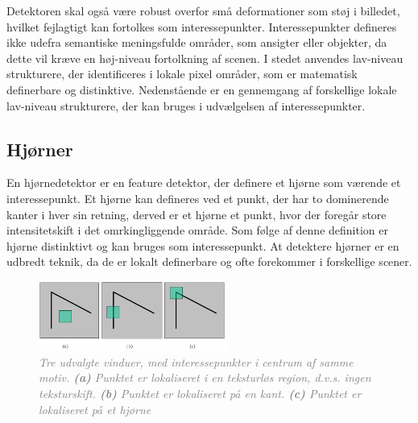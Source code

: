 Detektoren skal også være robust overfor små deformationer som støj i billedet, hvilket fejlagtigt kan fortolkes som interessepunkter. Interessepunkter defineres ikke udefra semantiske meningsfulde områder, som ansigter eller objekter, da dette vil kræve en høj-niveau fortolkning af scenen. I stedet anvendes lav-niveau strukturere, der identificeres i lokale pixel områder, som er matematisk definerbare og distinktive. Nedenstående er en gennemgang af forskellige lokale lav-niveau strukturere, der kan bruges i udvælgelsen af interessepunkter.
 \subsection{Hjørner}\label{subsec:corner}
En hjørnedetektor er en feature detektor, der definere et hjørne som værende et interessepunkt. Et hjørne kan defineres ved et punkt, der har to dominerende kanter i hver sin retning, derved er et hjørne et punkt, hvor der foregår store intensitetskift i det omrkingliggende område. Som følge af denne definition er hjørne distinktivt og kan bruges som interessepunkt. At detektere hjørner er en udbredt teknik, da de er lokalt definerbare og ofte forekommer i forskellige scener.
\begin{figure}[H]
    \centering
    \includegraphics[width=0.55\textwidth]{fig/6.png}
    \vspace{-1em}   
    \begin{center}    
    \caption{\textcolor{gray}{\footnotesize \textit{
     Tre udvalgte vinduer, med interessepunkter i centrum af samme motiv. \textbf{(a)} Punktet er lokaliseret i en teksturløs region, d.v.s. ingen teksturskift. \textbf{(b)} Punktet er lokaliseret på en kant. \textbf{(c)} Punktet er lokaliseret på et hjørne }}}
    \label{fig:2}
     \end{center}
    \vspace{-2.7em}  
  \end{figure}  
\noindent
